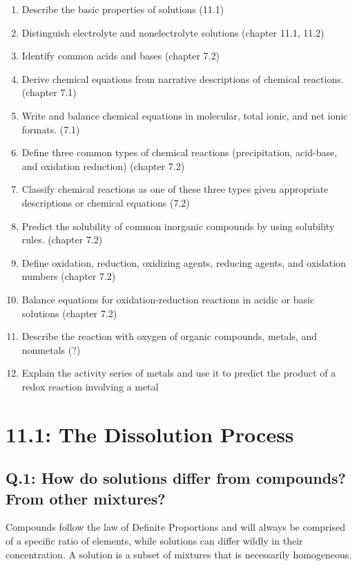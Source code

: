 \documentclass[10pt, letterpaper]{article}
\begin{document}
\begin{enumerate}
	\item Describe the basic properties of solutions (11.1)
	\item Distinguish electrolyte and nonelectrolyte solutions (chapter 11.1, 11.2)
	\item Identify common acids and bases (chapter 7.2)
	\item Derive chemical equations from narrative descriptions of chemical reactions.(chapter 7.1)
	\item Write and balance chemical equations in molecular, total ionic, and net ionic formats. (7.1)
	\item Define three common types of chemical reactions (precipitation, acid-base, and oxidation reduction) (chapter 7.2)
	\item Classify chemical reactions as one of these three types given appropriate descriptions or chemical equations (7.2)
	\item Predict the solubility of common inorganic compounds by using solubility rules. (chapter 7.2)
	\item Define oxidation, reduction, oxidizing agents, reducing agents, and oxidation numbers (chapter 7.2)
	\item Balance equations for oxidation-reduction reactions in acidic or basic solutions (chapter 7.2)
	\item Describe the reaction with oxygen of organic compounds, metals, and nonmetals (?)
	\item Explain the activity series of metals and use it to predict the product of a redox reaction involving a metal
\end{enumerate}


\section*{11.1: The Dissolution Process}

\subsection*{Q.1: How do solutions differ from compounds? From other mixtures?}
Compounds follow the law of Definite Proportions and will always be comprised
of a specific ratio of elements, while solutions can differ wildly in their
concentration.
A solution is a subset of mixtures that is necessarily homogeneous.
\end{document}
